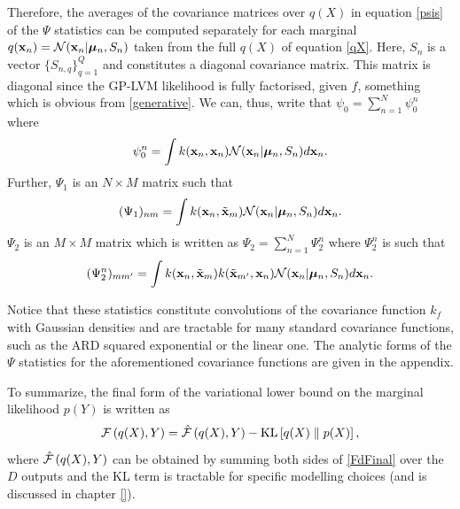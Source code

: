 Therefore, the averages of the covariance matrices
over $q(X)$ in equation \eqref{psis} of the $\Psi$ statistics
can be computed separately for each marginal
$q(\mathbf{x}_n) = \mathcal{N}(\mathbf{x}_n | \boldsymbol \mu_n, S_n)$ taken from the full $q(X)$ of equation \eqref{qX}.
Here, $S_n$ is a vector $\{ S_{n,q}\}_{q=1}^Q$ and constitutes a diagonal
covariance matrix. This matrix is diagonal since the GP-LVM likelihood is
fully factorised, given $f$, something which is obvious from \eqref{generative}.
We can, thus, write that $\psi_0 = \sum_{n=1}^N \psi_0^n$
where
\begin{equation}
\psi_0^n = \int k(\mathbf{x}_n,\mathbf{x}_n) \mathcal{N}(\mathbf{x}_n |\boldsymbol \mu_n , S_n) d \mathbf{x}_n.
\label{eq:psi0}
\end{equation}
Further,
$\Psi_1$ is an $N \times M$ matrix such that  
\begin{equation}
  (\Psi_1)_{nm} = \int k(\mathbf{x}_n,\tilde{\mathbf{x}}_m) \mathcal{N}(\mathbf{x}_n|\boldsymbol \mu_n, S_n) d
  \mathbf{x}_n.
\label{eq:psi1}
\end{equation}
$\Psi_2$ is an $M \times M$ matrix which is written as
 $\Psi_2 = \sum_{n=1}^N \Psi_2^n$ where $\Psi_2^n$ is such that 
\begin{equation}
  (\Psi^n_2)_{m m'} = \int k(\mathbf{x}_n,\tilde{\mathbf{x}}_m)
  k(\tilde{\mathbf{x}}_{m'},\mathbf{x}_n) \mathcal{N}(\mathbf{x}_n|\boldsymbol \mu_n, S_n) d \mathbf{x}_n.
\label{eq:psi2}
\end{equation}

Notice that these
statistics constitute convolutions of the covariance function $k_f$ with Gaussian densities and 
are tractable for many standard covariance functions, such as the ARD squared exponential or the linear one.
The analytic forms of the $\Psi$ statistics for the aforementioned covariance functions are
given in the appendix.



To summarize, the final form of the variational lower bound on the marginal
likelihood $p(Y)$ is written as
\begin{equation}
\mathcal{F} \left( q(X), Y \right) = \hat{\mathcal{F}} \left( q(X), Y \right) - \text{KL} \left[ q(X) \parallel p(X) \right], \label{jensensSplit2}
\end{equation}
where $\hat{\mathcal{F}} \left( q(X), Y \right)$  can be obtained by summing both sides of \eqref{FdFinal} over the
$D$ outputs and the KL term is tractable for specific modelling choices (and is discussed in chapter \ref{}).

